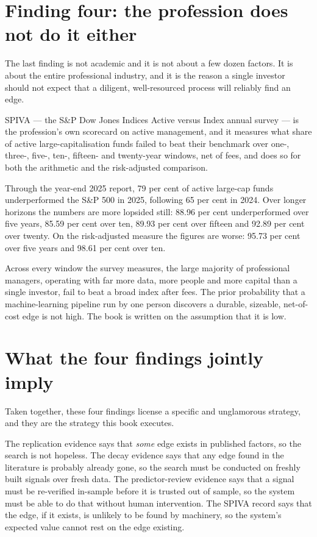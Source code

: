 \section{Finding four: the profession does not do it either}

The last finding is not academic and it is not about a few dozen factors. It
is about the entire professional industry, and it is the reason a single
investor should not expect that a diligent, well-resourced process will
reliably find an edge.

SPIVA --- the S\&P Dow Jones Indices Active versus Index annual survey ---
is the profession's own scorecard on active management, and it measures what
share of active large-capitalisation funds failed to beat
their benchmark over one-, three-, five-, ten-, fifteen- and twenty-year
windows, net of fees, and does so for both the arithmetic and the
risk-adjusted comparison.

Through the year-end 2025 report, 79 per cent of active large-cap funds
underperformed the S\&P 500 in 2025, following 65 per cent in 2024. Over
longer horizons the numbers are more lopsided still: 88.96 per cent
underperformed over five years, 85.59 per cent over ten, 89.93 per cent over
fifteen and 92.89 per cent over twenty. On the risk-adjusted measure the
figures are worse: 95.73 per cent over five years and 98.61 per cent over
ten.

\begin{takeaway}
Across every window the survey measures, the large majority of professional
managers, operating with far more data, more people and more capital than a
single investor, fail to beat a broad index after fees. The prior
probability that a machine-learning pipeline run by one person discovers a
durable, sizeable, net-of-cost edge is not high. The book is written on the
assumption that it is low.
\end{takeaway}

\section{What the four findings jointly imply}

Taken together, these four findings license a specific and unglamorous
strategy, and they are the strategy this book executes.

The replication evidence says that \emph{some} edge exists in published
factors, so the search is not hopeless. The decay evidence says that any
edge found in the literature is probably already gone, so the search must
be conducted on freshly built signals over fresh data. The predictor-review
evidence says that a signal must be re-verified in-sample before it is
trusted out of sample, so the system must be able to do that without
human intervention. The SPIVA record says that the edge, if it exists, is
unlikely to be found by machinery, so the system's expected value cannot
rest on the edge existing.


